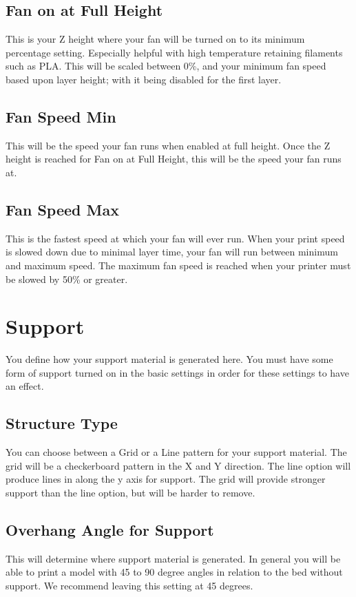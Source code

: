 \subsection{Fan on at Full Height}
This is your Z height where your fan will be turned on to its minimum percentage setting. Especially helpful with high temperature retaining filaments such as PLA. This will be scaled between 0\%, and your minimum fan speed based upon layer height; with it being disabled for the first layer.

\subsection{Fan Speed Min}

This will be the speed your fan runs when enabled at full height. Once the Z height is reached for Fan on at Full Height, this will be the speed your fan runs at.

\subsection{Fan Speed Max}
This is the fastest speed at which your fan will ever run. When your print speed is slowed down due to minimal layer time, your fan will run between minimum and maximum speed. The maximum fan speed is reached when your printer must be slowed by 50\% or greater.

\section{Support}
You define how your support material is generated here. You must have some form of support turned on in the basic settings in order for these settings to have an effect.

\subsection{Structure Type}
You can choose between a Grid or a Line pattern for your support material. The grid will be a checkerboard pattern in the X and Y direction. The line option will produce lines in along the y axis for support. The grid will provide stronger support than the line option, but will be harder to remove.

\subsection{Overhang Angle for Support}
This will determine where support material is generated. In general you will be able to print a model with 45 to 90 degree angles in relation to the bed without support. We recommend leaving this setting at 45 degrees.


